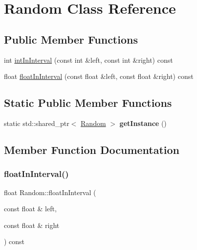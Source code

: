 \hypertarget{class_random}{}\section{Random Class Reference}
\label{class_random}
\subsection*{Public Member Functions}
\begin{DoxyCompactItemize}
\item 
int \hyperlink{class_random_a35a3289bf89b45e55c3cb69bf36453c2}{int\+In\+Interval} (const int \&left, const int \&right) const
\item 
float \hyperlink{class_random_ab74f1a7b95a41426f87698f400b382e8}{float\+In\+Interval} (const float \&left, const float \&right) const
\end{DoxyCompactItemize}
\subsection*{Static Public Member Functions}
\begin{DoxyCompactItemize}
\item 
\mbox{\label{class_random_af3f69a0efaceb95bec54043d4becda09}} 
static std\+::shared\+\_\+ptr$<$ \hyperlink{class_random}{Random} $>$ {\bfseries get\+Instance} ()
\end{DoxyCompactItemize}


\subsection{Member Function Documentation}
\mbox{\label{class_random_ab74f1a7b95a41426f87698f400b382e8}} 
\subsubsection{\texorpdfstring{float\+In\+Interval()}{floatInInterval()}}
{\footnotesize\ttfamily float Random\+::float\+In\+Interval (\begin{DoxyParamCaption}\item[{const float \&}]{left,  }\item[{const float \&}]{right }\end{DoxyParamCaption}) const\hspace{0.3cm}{\ttfamily [inline]}}


